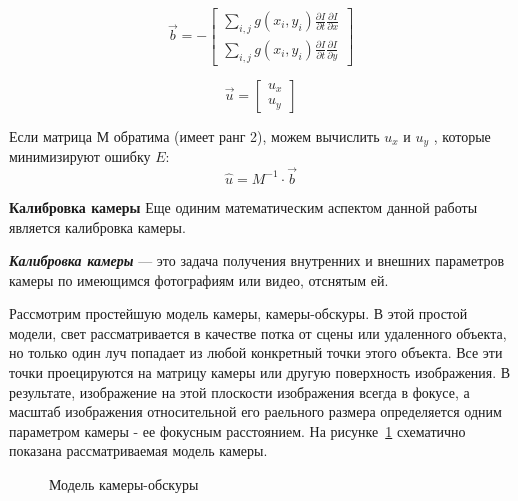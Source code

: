 $$
\vec{b} = -
\left[ 	
\begin{array}{c}
\sum \limits_{i,j} g(x_i, y_i) 
			\frac{\partial I}{\partial t} 										\frac{\partial I}{\partial x}  \\ 
\sum \limits_{i,j} g(x_i, y_i) 
			\frac{\partial I}{\partial t} 										\frac{\partial I}{\partial y}
\end{array} 
\right]
$$

$$
\vec{u} = 
\left[ 	
\begin{array}{c}
  u_x\\ 
	u_y
\end{array} 
\right]
$$

Если матрица М обратима (имеет ранг 2), можем вычислить $u_x$ и $u_y$ , которые минимизируют ошибку $E$\cite{habrOpticalFlowAbout}:
$$
\widehat{u} = M^{-1} \cdot \vec{b}
$$

\textbf{Калибровка камеры}
Еще одиним математическим аспектом данной работы является калибровка камеры. 

\textit{\textbf{Калибровка камеры}} — это задача получения внутренних и внешних параметров камеры по имеющимся фотографиям или видео, отснятым ей\cite{wikiCalibrate}.

Рассмотрим простейшую модель камеры, камеры-обскуры. В этой простой модели, свет рассматривается в качестве потка от сцены или удаленного объекта, но только один луч попадает из любой конкретный точки этого объекта. Все эти точки проецируются на матрицу камеры или другую поверхность изображения. В результате, изображение на этой плоскости изображения всегда в фокусе, а масштаб изображения относительной его раельного размера определяется одним параметром камеры -  ее фокусным расстоянием. На рисунке~\ref{pic:cameraModel} схематично показана рассматриваемая модель камеры\cite{OpenCVBook}. 

\begin{figure}[!htb]
\caption{Модель камеры-обскуры}
\label{pic:cameraModel}
\end{figure}

